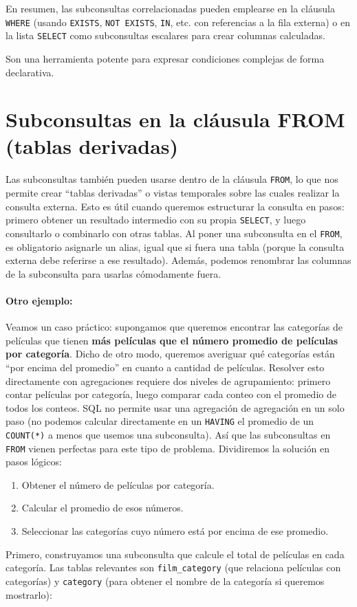 \documentclass[12pt,a4paper]{article}
\begin{document}
En resumen, las subconsultas correlacionadas pueden emplearse en la cláusula \texttt{WHERE} (usando \texttt{EXISTS}, \texttt{NOT EXISTS}, \texttt{IN}, etc.
%
con referencias a la fila externa) o en la lista \texttt{SELECT} como subconsultas escalares para crear columnas calculadas.


Son una herramienta potente para expresar condiciones complejas de forma declarativa. \section{Subconsultas en la cláusula FROM (tablas derivadas)} Las subconsultas también pueden usarse dentro de la cláusula \texttt{FROM}, lo que nos permite crear “tablas derivadas” o vistas temporales sobre las cuales realizar la consulta externa.
%
Esto es útil cuando queremos estructurar la consulta en pasos: primero obtener un resultado intermedio con su propia \texttt{SELECT}, y luego consultarlo o combinarlo con otras tablas.
%
Al poner una subconsulta en el \texttt{FROM}, es obligatorio asignarle un alias, igual que si fuera una tabla (porque la consulta externa debe referirse a ese resultado).
%
Además, podemos renombrar las columnas de la subconsulta para usarlas cómodamente fuera.

\paragraph{Otro ejemplo:}
Veamos un caso práctico: supongamos que queremos encontrar las categorías de películas que tienen \textbf{más películas que el número promedio de películas por categoría}.
%
Dicho de otro modo, queremos averiguar qué categorías están “por encima del promedio” en cuanto a cantidad de películas.
%
Resolver esto directamente con agregaciones requiere dos niveles de agrupamiento: primero contar películas por categoría, luego comparar cada conteo con el promedio de todos los conteos.
%
SQL no permite usar una agregación de agregación en un solo paso (no podemos calcular directamente en un \texttt{HAVING} el promedio de un \texttt{COUNT(*)} a menos que usemos una subconsulta).
%
Así que las subconsultas en \texttt{FROM} vienen perfectas para este tipo de problema.
%
Dividiremos la solución en pasos lógicos: 


\begin{enumerate}
\item Obtener el número de películas por categoría.
\item Calcular el promedio de esos números.
\item Seleccionar las categorías cuyo número está por encima de ese promedio.
\end{enumerate} Primero, construyamos una subconsulta que calcule el total de películas en cada categoría.
%
Las tablas relevantes son \texttt{film\_category} (que relaciona películas con categorías) y \texttt{category} (para obtener el nombre de la categoría si queremos mostrarlo): 
\end{document}
